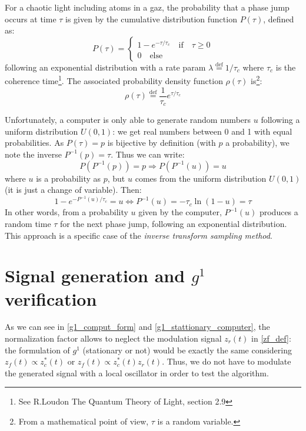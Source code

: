 \documentclass[11pt]{report}
\begin{document}
For a chaotic light including atoms in a gaz, the probability that a phase jump occurs at time $\tau$ is given by the cumulative distribution function $P(\tau)$, defined as:
\begin{equation}
P(\tau) = \left\{
                \begin{array}{ll}
                1-e^{-\tau/\tau_c} \quad \textrm{if} \quad \tau \geqslant 0\\
                0 \quad \textrm{else}
                \end{array}
              \right.
\end{equation}
following an exponential distribution with a rate param $\lambda \stackrel{\text{def}}{=} 1 / \tau_c$ where $\tau_c$ is the coherence time\footnote{ See R.Loudon The Quantum Theory of Light, section 2.9}. The associated probability density function $\rho(\tau)$ is\footnote{From a mathematical point of view, $\tau$ is a random variable.}:
\begin{equation}
\rho(\tau) \stackrel{\text{def}}{=} \frac{1}{\tau_c} e^{\tau / \tau_c}
\end{equation}

Unfortunately, a computer is only able to generate random numbers $u$ following a uniform distribution $U(0,1)$: we get real numbers between 0 and 1 with equal probabilities. As $P(\tau) = p$ is bijective by definition (with $p$ a probability), we note the inverse $P^{-1}(p) = \tau$. Thus we can write:
\begin{equation}
P(P^{-1}(p)) = p \Rightarrow P(P^{-1}(u)) = u
\end{equation}
where $u$ is a probability as $p$, but $u$ comes from the uniform distribution $U(0,1)$ (it is just a change of variable). Then:
\begin{equation}
\label{dist_exp_gene}
1-e^{-P^{-1}(u)/\tau_c} = u \Leftrightarrow P^{-1}(u) = -\tau_c \ln(1-u) = \tau
\end{equation}
In other words, from a probability $u$ given by the computer, $P^{-1}(u)$ produces a random time $\tau$ for the next phase jump, following an exponential distribution. This approach is a specific case of the \textit{inverse transform sampling method}.

\section{Signal generation and $g^1$ verification}

As we can see in \eqref{g1_comput_form} and \eqref{g1_stattionary_computer}, the normalization factor allows to neglect the modulation signal $z_r(t)$ in \eqref{zf_def}: the formulation of $g^1$ (stationary or not) would be exactly the same considering $z_f(t) \propto z_c^*(t)$ or $z_f(t) \propto z_c^*(t)z_r(t)$. Thus, we do not have to modulate the generated signal with a local oscillator in order to test the algorithm.
\end{document}
